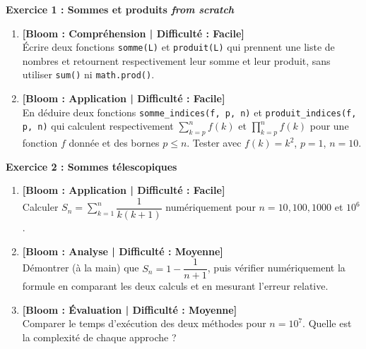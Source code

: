 \vspace{0.3cm}

\noindent\textbf{Exercice 1 : Sommes et produits \textit{from scratch}}
\begin{enumerate}
    \item \textbf{[Bloom : Compréhension | Difficulté : Facile]} \\
    Écrire deux fonctions \texttt{somme(L)} et \texttt{produit(L)} qui prennent une liste de nombres et retournent respectivement leur somme et leur produit, sans utiliser \texttt{sum()} ni \texttt{math.prod()}.
    \item \textbf{[Bloom : Application | Difficulté : Facile]} \\
    En déduire deux fonctions \texttt{somme\_indices(f, p, n)} et \texttt{produit\_indices(f, p, n)} qui calculent respectivement $\sum_{k=p}^{n} f(k)$ et $\prod_{k=p}^{n} f(k)$ pour une fonction $f$ donnée et des bornes $p \le n$. Tester avec $f(k) = k^2$, $p=1$, $n=10$.
\end{enumerate}

\vspace{0.3cm}

\noindent\textbf{Exercice 2 : Sommes télescopiques}
\begin{enumerate}
    \item \textbf{[Bloom : Application | Difficulté : Facile]} \\
    Calculer $S_n = \sum_{k=1}^{n} \dfrac{1}{k(k+1)}$ numériquement pour $n = 10, 100, 1000$ et $10^6$.
    \item \textbf{[Bloom : Analyse | Difficulté : Moyenne]} \\
    Démontrer (à la main) que $S_n = 1 - \dfrac{1}{n+1}$, puis vérifier numériquement la formule en comparant les deux calculs et en mesurant l'erreur relative.
    \item \textbf{[Bloom : Évaluation | Difficulté : Moyenne]} \\
    Comparer le temps d'exécution des deux méthodes pour $n = 10^7$. Quelle est la complexité de chaque approche ?
\end{enumerate}

\vspace{0.3cm}

